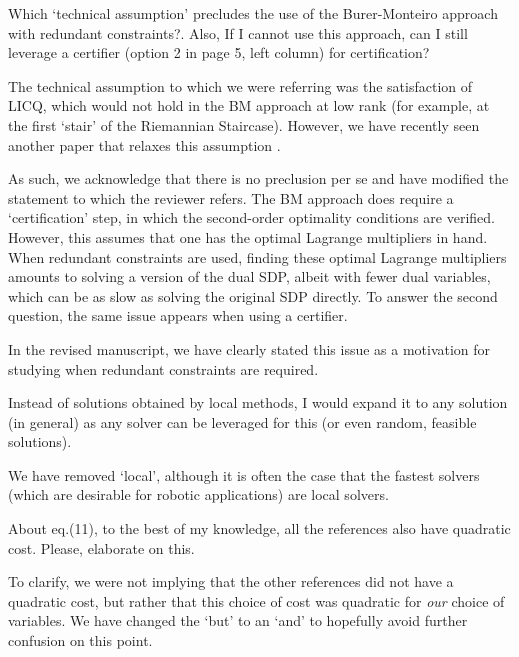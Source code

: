 Which ‘technical assumption’ precludes the use of the Burer-Monteiro approach with redundant constraints?. Also, If I cannot use this approach, can I still leverage a certifier (option 2 in page 5, left column) for certification? 
\begin{response}
The technical assumption to which we were referring was the satisfaction of LICQ, which would not hold in the BM approach at low rank (for example, at the first `stair' of the Riemannian Staircase). However, we have recently seen another paper that relaxes this assumption \cite{boumalDeterministicGuaranteesBurerMonteiro2020a}.

As such, we acknowledge that there is no preclusion per se and have modified the statement to which the reviewer refers. The BM approach does require a `certification' step, in which the second-order optimality conditions are verified. However, this assumes that one has the optimal Lagrange multipliers in hand. When redundant constraints are used, finding these optimal Lagrange multipliers amounts to solving a version of the dual SDP, albeit with fewer dual variables, which can be as slow as solving the original SDP directly. To answer the second question, the same issue appears when using a certifier.

In the revised manuscript, we have clearly stated this issue as a motivation for studying when redundant constraints are required. 



\end{response}

Instead of solutions obtained by local methods, I would expand it to any solution (in general) as any solver can be leveraged for this (or even random, feasible solutions). 
\begin{response}
We have removed `local', although it is often the case that the fastest solvers (which are desirable for robotic applications) are local solvers.  
\end{response}

About eq.(11), to the best of my knowledge, all the references also have quadratic cost. Please, elaborate on this.
\begin{response}
    To clarify, we were not implying that the other references did not have a quadratic cost, but rather that this choice of cost was quadratic for \emph{our} choice of variables. We have changed the `but' to an `and' to hopefully avoid further confusion on this point. 
\end{response}

